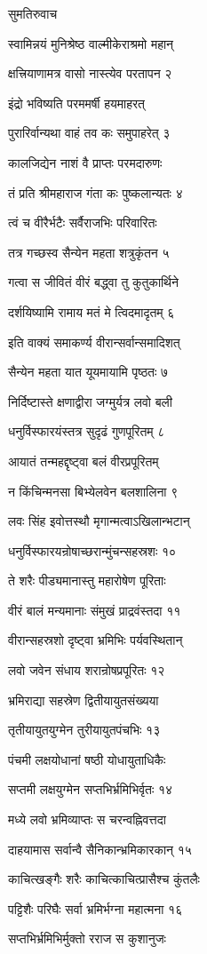 सुमतिरुवाच

स्वामिन्नयं मुनिश्रेष्ठ वाल्मीकेराश्रमो महान्

क्षत्त्रियाणामत्र वासो नास्त्येव परतापन २

इंद्रो भविष्यति परममर्षी हयमाहरत्

पुरारिर्वान्यथा वाहं तव कः समुपाहरेत् ३

कालजिद्येन नाशं वै प्राप्तः परमदारुणः

तं प्रति श्रीमहाराज गंता कः पुष्कलान्यतः ४

त्वं च वीरैर्भटैः सर्वैराजभिः परिवारितः

तत्र गच्छस्व सैन्येन महता शत्रुकृंतन ५

गत्वा स जीवितं वीरं बद्ध्वा तु कुतुकार्थिने

दर्शयिष्यामि रामाय मतं मे त्विदमादृतम् ६

इति वाक्यं समाकर्ण्य वीरान्सर्वान्समादिशत्

सैन्येन महता यात यूयमायामि पृष्ठतः ७

निर्दिष्टास्ते क्षणाद्वीरा जग्मुर्यत्र लवो बली

धनुर्विस्फारयंस्तत्र सुदृढं गुणपूरितम् ८

आयातं तन्महद्दृष्ट्वा बलं वीरप्रपूरितम्

न किंचिन्मनसा बिभ्येलवेन बलशालिना ९

लवः सिंह इवोत्तस्थौ मृगान्मत्वाऽखिलान्भटान्

धनुर्विस्फारयन्रोषाच्छरान्मुंचन्सहस्रशः १०

ते शरैः पीड्यमानास्तु महारोषेण पूरिताः

वीरं बालं मन्यमानाः संमुखं प्राद्रवंस्तदा ११

वीरान्सहस्रशो दृष्ट्वा भ्रमिभिः पर्यवस्थितान्

लवो जवेन संधाय शरान्रोषप्रपूरितः १२

भ्रमिराद्या सहस्रेण द्वितीयायुतसंख्यया

तृतीयायुतयुग्मेन तुरीयायुतपंचभिः १३

पंचमी लक्षयोधानां षष्ठी योधायुताधिकैः

सप्तमी लक्षयुग्मेन सप्तभिर्भ्रमिभिर्वृतः १४

मध्ये लवो भ्रमिव्याप्तः स चरन्वह्निवत्तदा

दाहयामास सर्वान्वै सैनिकान्भ्रमिकारकान् १५

काचित्खङ्गैः शरैः काचित्काचित्प्रासैश्च कुंतलैः

पट्टिशैः परिघैः सर्वा भ्रमिर्भग्ना महात्मना १६

सप्तभिर्भ्रमिभिर्मुक्तो रराज स कुशानुजः

